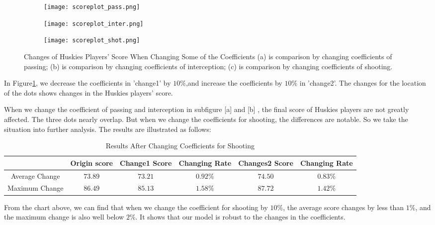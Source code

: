 \documentclass[12pt]{mcmthesis}
\begin{document}
\begin{figure}[h]
	\centering
	\begin{subfigure}[b]{0.32\textwidth}
		\texttt{[image: scoreplot\_pass.png]}
		\caption{}
	\end{subfigure}
	\begin{subfigure}[b]{0.32\textwidth}
		\texttt{[image: scoreplot\_inter.png]}
		\caption{}
	\end{subfigure}
	\begin{subfigure}[b]{0.32\textwidth}
		\texttt{[image: scoreplot\_shot.png]}
		\caption{}
	\end{subfigure}
	\caption{Changes of Huskies Players' Score When Changing Some of the Coefficients (a) is comparison by changing coefficients of passing; (b) is comparison by changing coefficients of interception; (c) is comparison by changing coefficients of shooting.}
	\label{fig:snsi_rate}
\end{figure}

In Figure\ref{fig:snsi_rate}, we decrease the coefficients in 'change1' by $10\%$,and increase the coefficients by $10\%$ in 'change2'. The changes for the location of the dots shows changes in the Huskies players' score.

When we change the coefficient of passing and interception in subfigure [a] and [b] , the final score of Huskies players are not greatly affected. The three dots nearly overlap. But when we change the coefficients for shooting, the differences are notable. So we take the situation into further analysis. The results are illustrated as follows:
\begin{table}[h]
	\centering
	\caption{Results After Changing Coefficients for Shooting}
	\label{tab:snsi_rating}
	\begin{tabular}{|c|c|c|c|c|c|}
		\hline
		&Origin score&Change1 Score& Changing Rate&Changes2 Score&Changing Rate\\
		\hline
		Average Change&$73.89$&$73.21$&$0.92\% $&$74.50$&$0.83\%$\\
		\hline
		Maximum Change&$86.49$&$85.13$&$1.58\% $&$87.72$&$1.42\%$\\
		\hline
	\end{tabular}
\end{table}

From the chart above, we can find that when we change the coefficient for shooting by $10\%$, the average score changes by less than $1\%$, and the maximum change is also well below $2\%$. It shows that our model is robust to the changes in the coefficients.
\end{document}
